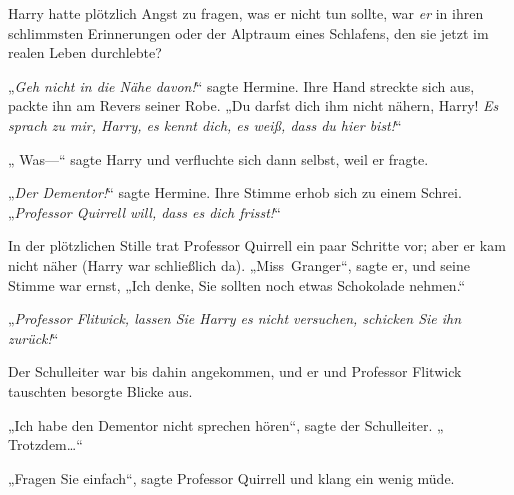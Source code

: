 Harry hatte plötzlich Angst zu fragen, was er nicht tun sollte, war \emph{er} in ihren schlimmsten Erinnerungen oder der Alptraum eines Schlafens, den sie jetzt im realen Leben durchlebte?

„\emph{Geh nicht in die Nähe davon!}“ sagte Hermine. Ihre Hand streckte sich aus, packte ihn am Revers seiner Robe. „Du darfst dich ihm nicht nähern, Harry! \emph{Es sprach zu mir, Harry, es kennt dich, es weiß, dass du hier bist!}“

„ Was—“ sagte Harry und verfluchte sich dann selbst, weil er fragte.

„\emph{Der Dementor!}“ sagte Hermine. Ihre Stimme erhob sich zu einem Schrei. „\emph{Professor Quirrell will, dass es dich frisst!}“

In der plötzlichen Stille trat Professor Quirrell ein paar Schritte vor; aber er kam nicht näher (Harry war schließlich da). „Miss~Granger“, sagte er, und seine Stimme war ernst, „Ich denke, Sie sollten noch etwas Schokolade nehmen.“

„\emph{Professor Flitwick, lassen Sie Harry es nicht versuchen, schicken Sie ihn zurück!}“

Der Schulleiter war bis dahin angekommen, und er und Professor Flitwick tauschten besorgte Blicke aus.

„Ich habe den Dementor nicht sprechen hören“, sagte der Schulleiter. „ Trotzdem…“

„Fragen Sie einfach“, sagte Professor Quirrell und klang ein wenig müde.

